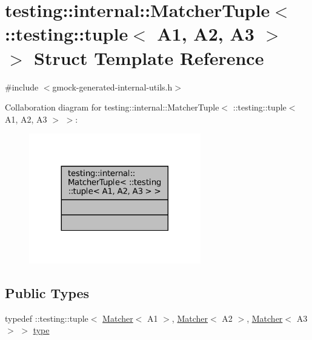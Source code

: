 \hypertarget{structtesting_1_1internal_1_1MatcherTuple_3_01_1_1testing_1_1tuple_3_01A1_00_01A2_00_01A3_01_4_01_4}{}\section{testing\+:\+:internal\+:\+:Matcher\+Tuple$<$ \+:\+:testing\+:\+:tuple$<$ A1, A2, A3 $>$ $>$ Struct Template Reference}
\label{structtesting_1_1internal_1_1MatcherTuple_3_01_1_1testing_1_1tuple_3_01A1_00_01A2_00_01A3_01_4_01_4}


{\ttfamily \#include $<$gmock-\/generated-\/internal-\/utils.\+h$>$}



Collaboration diagram for testing\+:\+:internal\+:\+:Matcher\+Tuple$<$ \+:\+:testing\+:\+:tuple$<$ A1, A2, A3 $>$ $>$\+:
\nopagebreak
\begin{figure}[H]
\begin{center}
\leavevmode
\includegraphics[width=212pt]{structtesting_1_1internal_1_1MatcherTuple_3_01_1_1testing_1_1tuple_3_01A1_00_01A2_00_01A3_01_4_01_4__coll__graph}
\end{center}
\end{figure}
\subsection*{Public Types}
\begin{DoxyCompactItemize}
\item 
typedef \+::testing\+::tuple$<$ \hyperlink{classtesting_1_1Matcher}{Matcher}$<$ A1 $>$, \hyperlink{classtesting_1_1Matcher}{Matcher}$<$ A2 $>$, \hyperlink{classtesting_1_1Matcher}{Matcher}$<$ A3 $>$ $>$ \hyperlink{structtesting_1_1internal_1_1MatcherTuple_3_01_1_1testing_1_1tuple_3_01A1_00_01A2_00_01A3_01_4_01_4_a14ce558da46f2d3829b2dfacdab2c980}{type}
\end{DoxyCompactItemize}


